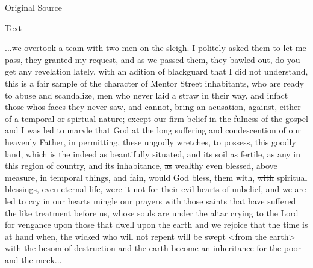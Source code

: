 			
			\begin{description}
				\item[Original Source]
			\end{description}
			
			
			\begin{description}
				\item[Text]
			\end{description}
			
				...we overtook a team with two men on the sleigh. I politely asked them to let me pass, they granted my request, and as we passed them, they bawled out, do you get any revelation lately, with an adition of blackguard that I did not understand, this is a fair sample of the character of Mentor Street inhabitants, who are ready to abuse and scandalize, men who never laid a straw in their way, and infact those whos faces they never saw, and cannot, bring an acusation, against, either of a temporal or spirtual nature; except our firm belief in the fulness of the gospel and I was led to marvle \sout{that} \sout{God} at the long suffering and condescention of our heavenly Father, in permitting, these ungodly wretches, to possess, this goodly land, which is \sout{the} indeed as beautifully situated, and its soil as fertile, as any in this region of country, and its inhabitance, \sout{as} wealthy even blessed, above measure, in temporal things, and fain, would God bless, them with, \sout{with} spiritual blessings, even eternal life, were it not for their evil hearts of unbelief, and we are led to \sout{cry} \sout{in} \sout{our} \sout{hearts} mingle our prayers with those saints that have suffered the like treatment before us, whose souls are under the altar crying to the Lord for vengance upon those that dwell upon the earth and we rejoice that the time is at hand when, the wicked who will not repent will be swept <from the earth> with the besom of destruction and the earth become an inheritance for the poor and the meek...
				
